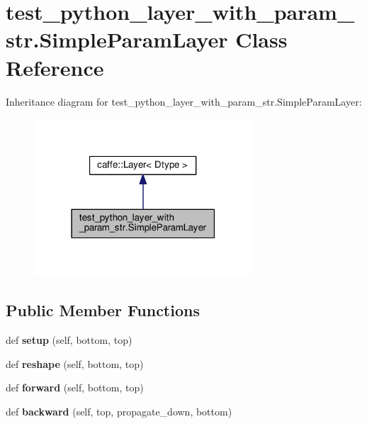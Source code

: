 \hypertarget{classtest__python__layer__with__param__str_1_1_simple_param_layer}{}\section{test\+\_\+python\+\_\+layer\+\_\+with\+\_\+param\+\_\+str.\+Simple\+Param\+Layer Class Reference}
\label{classtest__python__layer__with__param__str_1_1_simple_param_layer}


Inheritance diagram for test\+\_\+python\+\_\+layer\+\_\+with\+\_\+param\+\_\+str.\+Simple\+Param\+Layer\+:
\nopagebreak
\begin{figure}[H]
\begin{center}
\leavevmode
\includegraphics[width=231pt]{classtest__python__layer__with__param__str_1_1_simple_param_layer__inherit__graph}
\end{center}
\end{figure}
\subsection*{Public Member Functions}
\begin{DoxyCompactItemize}
\item 
\mbox{\label{classtest__python__layer__with__param__str_1_1_simple_param_layer_adeff86655a9c8657ae11f4828d5d41e8}} 
def {\bfseries setup} (self, bottom, top)
\item 
\mbox{\label{classtest__python__layer__with__param__str_1_1_simple_param_layer_a89390754dacc804ad729e7918cbd20b9}} 
def {\bfseries reshape} (self, bottom, top)
\item 
\mbox{\label{classtest__python__layer__with__param__str_1_1_simple_param_layer_a37a85e95675e506dbba5c3192efcf5f0}} 
def {\bfseries forward} (self, bottom, top)
\item 
\mbox{\label{classtest__python__layer__with__param__str_1_1_simple_param_layer_a0c18e199de7e57b840eb0d7453896aa9}} 
def {\bfseries backward} (self, top, propagate\+\_\+down, bottom)
\end{DoxyCompactItemize}
